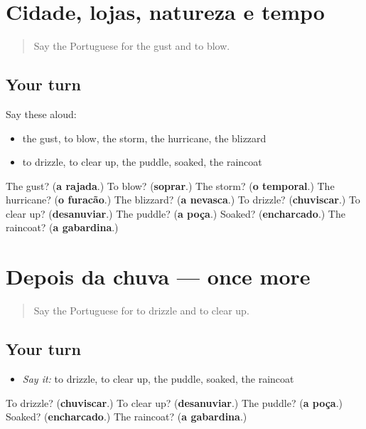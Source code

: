 \section[(dialogue)]{Cidade, lojas, natureza e tempo}

\label{lesson:PT-R466-revisao-465-466}



\begin{quote}
Say the Portuguese for the gust and to blow.
\end{quote}

\subsection*{Your turn}
Say these aloud:

\begin{itemize}
\raggedright
  \item the gust, to blow, the storm, the hurricane, the blizzard
  \item to drizzle, to clear up, the puddle, soaked, the raincoat
\end{itemize}

\begin{tcolorbox}[breakable,colback=teal!4,colframe=teal!35!black,title={Before you move on}]
The gust? (\textbf{a rajada}.) To blow? (\textbf{soprar}.) The storm? (\textbf{o temporal}.) The hurricane? (\textbf{o furacão}.) The blizzard? (\textbf{a nevasca}.) To drizzle? (\textbf{chuviscar}.) To clear up? (\textbf{desanuviar}.) The puddle? (\textbf{a poça}.) Soaked? (\textbf{encharcado}.) The raincoat? (\textbf{a gabardina}.)
\end{tcolorbox}
\section[(dialogue)]{Depois da chuva — once more}

\label{lesson:PT-R466-revisao-final-466}



\begin{quote}
Say the Portuguese for to drizzle and to clear up.
\end{quote}

\subsection*{Your turn}
\begin{itemize}
\raggedright
  \item \emph{Say it:} to drizzle, to clear up, the puddle, soaked, the raincoat
\end{itemize}

\begin{tcolorbox}[breakable,colback=teal!4,colframe=teal!35!black,title={Before you move on}]
To drizzle? (\textbf{chuviscar}.) To clear up? (\textbf{desanuviar}.) The puddle? (\textbf{a poça}.) Soaked? (\textbf{encharcado}.) The raincoat? (\textbf{a gabardina}.)
\end{tcolorbox}
